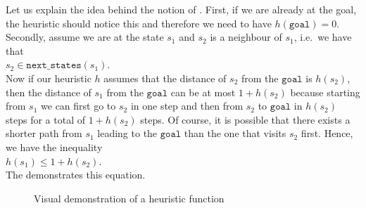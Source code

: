 Let us explain the idea behind the notion of .  First, if we are already at the goal, the heuristic
should notice this and therefore we need to have $h(\mathtt{goal}) = 0$.  Secondly, assume we are at the state
$s_1$ and $s_2$ is a neighbour of $s_1$, i.e.~we have that
\\[0.2cm]
\hspace*{1.3cm}
$s_2 \in \mathtt{next\_states}(s_1)$.
\\[0.2cm]
Now if our heuristic $h$ assumes that the distance of $s_2$ from the $\texttt{goal}$ is $h(s_2)$, then the distance of
$s_1$ from the $\texttt{goal}$ can be at most $1 + h(s_2)$ because starting from $s_1$ we can first go to $s_2$
in one step and then from $s_2$ to $\texttt{goal}$ in $h(s_2)$ steps for a total of $1 + h(s_2)$ steps.  Of
course, it is possible that there exists a shorter path from $s_1$ leading to the $\texttt{goal}$ than the one
that visits $s_2$ first.  Hence, we have the inequality
\\[0.2cm]
\hspace*{1.3cm}
$h(s_1) \leq 1 + h(s_2)$.
\\[0.2cm]
The  demonstrates this equation.

\begin{figure}[!ht]
    \centering
    \caption{Visual demonstration of a heuristic function}
    \label{fig:demonstration-heuristic.tikz}
\end{figure}

